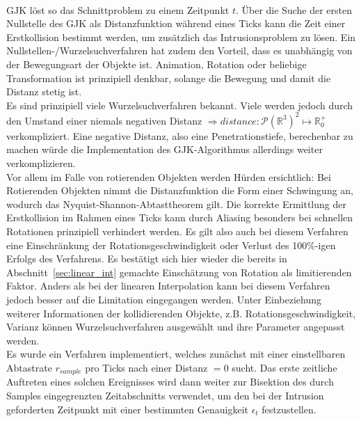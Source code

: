 ~\\
GJK löst so das Schnittproblem zu einem Zeitpunkt $t$. Über die Suche der ersten Nullstelle des GJK als Distanzfunktion während eines Ticks kann die Zeit einer Erstkollision bestimmt werden, um zusätzlich das Intrusionsproblem zu lösen.
Ein Nullstellen-/Wurzelsuchverfahren hat zudem den Vorteil, dass es unabhängig von der Bewegungsart der Objekte ist. Animation, Rotation oder beliebige Transformation ist prinzipiell denkbar, solange die Bewegung und damit die Distanz stetig ist.\\
Es sind prinzipiell viele Wurzelsuchverfahren bekannt. Viele werden jedoch durch den Umstand einer niemals negativen Distanz $\Rightarrow distance: \mathcal{P}(\mathbb{R}^3)^2 \mapsto \mathbb{R}^+_0$ verkompliziert. Eine negative Distanz, also eine Penetrationstiefe, berechenbar zu machen würde die Implementation des GJK-Algorithmus allerdings weiter verkomplizieren.\\


Vor allem im Falle von rotierenden Objekten werden Hürden ersichtlich:
Bei Rotierenden Objekten nimmt die Distanzfunktion die Form einer Schwingung an, wodurch das Nyquist-Shannon-Abtasttheorem gilt. Die korrekte Ermittlung der Erstkollision im Rahmen eines Ticks kann durch Aliasing besonders bei schnellen Rotationen prinzipiell verhindert werden. Es gilt also auch bei diesem Verfahren eine Einschränkung der Rotationsgeschwindigkeit oder Verlust des 100\%-igen Erfolgs des Verfahrens. Es bestätigt sich hier wieder die bereits in Abschnitt~\ref{sec:linear_int} gemachte Einschätzung von Rotation als limitierenden Faktor. Anders als bei der linearen Interpolation kann bei diesem Verfahren jedoch besser auf die Limitation eingegangen werden. Unter Einbeziehung weiterer Informationen der kollidierenden Objekte, z.B. Rotationsgeschwindigkeit, Varianz können Wurzelsuchverfahren ausgewählt und ihre Parameter angepasst werden.\\
Es wurde ein Verfahren implementiert, welches zunächst mit einer einstellbaren Abtastrate $r_{sample}$  pro Ticks nach einer Distanz $= 0$ sucht. Das erste zeitliche Auftreten eines solchen Ereignisses wird dann weiter zur Bisektion des durch Samples eingegrenzten Zeitabschnitts verwendet, um den bei der Intrusion geforderten Zeitpunkt mit einer bestimmten Genauigkeit $\epsilon_t$ festzustellen.\\

